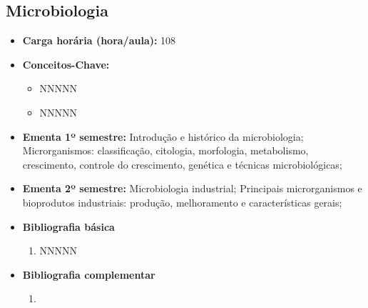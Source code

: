 \documentclass[11pt,fleqn]{book} %
\begin{document}
\subsection{Microbiologia}\label{disc:microbiologia}
\begin{itemize}
	\item \textbf{Carga horária (hora/aula):} 108
	\item \textbf{Conceitos-Chave:}
	\begin{itemize}
		\item NNNNN
		\item NNNNN
	\end{itemize}
	\item \textbf{Ementa 1º semestre:}
	Introdução e histórico da microbiologia; 
	Microrganismos: classificação, citologia, morfologia, metabolismo, crescimento, controle do crescimento, genética e técnicas microbiológicas;
	\item \textbf{Ementa 2º semestre:}
	Microbiologia industrial; 
	Principais microrganismos e bioprodutos industriais: produção, melhoramento e características gerais;	
	\item \textbf{Bibliografia básica}
	\begin{enumerate}
		\item NNNNN
	\end{enumerate}
	\item \textbf{Bibliografia complementar}
	\begin{enumerate}
		\item 
	\end{enumerate}	
\end{itemize}


\newpage
\end{document}
